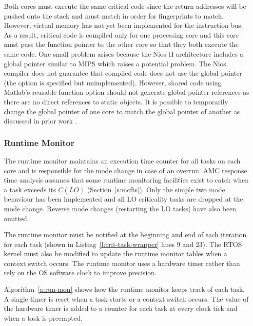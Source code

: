 
	Both cores must execute the same critical code since the return addresses will be pushed onto the stack and must match in order for fingerprints to match. 
	However, virtual memory has not yet been implemented for the instruction bus. 
	As a result, critical code is compiled only for one processing core and this core must pass the function pointer to the other core so that they both execute the same code. 
	One small problem arises because the Nios II architecture includes a global pointer similar to MIPS which raises a potential problem.
	The Nios compiler does not guarantee that compiled code does not use the global pointer (the option is specified but unimplemented). 
	However, shared code using Matlab's reusable function option should not generate global pointer references as there are no direct references to static objects. 
	It is possible to temporarily change the global pointer of one core to match the global pointer of another as discussed in prior work \cite{ugthesis}.


\subsubsection{Runtime Monitor}

	The runtime monitor maintains an execution time counter for all tasks on each core and is responsible for the mode change in case of an overrun.
	AMC response time analysis assumes that some runtime monitoring facilities exist to catch when a task exceeds its $C(LO)$ (Section~\ref{s:mcfts}). 
	Only the simple two mode behaviour has been implemented and all LO criticality tasks are dropped at the mode change. 
	Reverse mode changes (restarting the LO tasks) have also been omitted.

	The runtime monitor must be notified at the beginning and end of each iteration for each task (shown in Listing~\ref{l:crit-task-wrapper} lines 9 and 23). 
	The RTOS kernel must also be modified to update the runtime monitor tables when a context switch occurs. 
	The runtime monitor uses a hardware timer rather than rely on the OS software clock to improve precision.
	
	Algorithm~\ref{a:run-mon} shows how the runtime monitor keeps track of each task.
	A single timer is reset when a task starts or a context switch occurs.
	The value of the hardware timer is added to a counter for each task at every clock tick and when a task is preempted.

